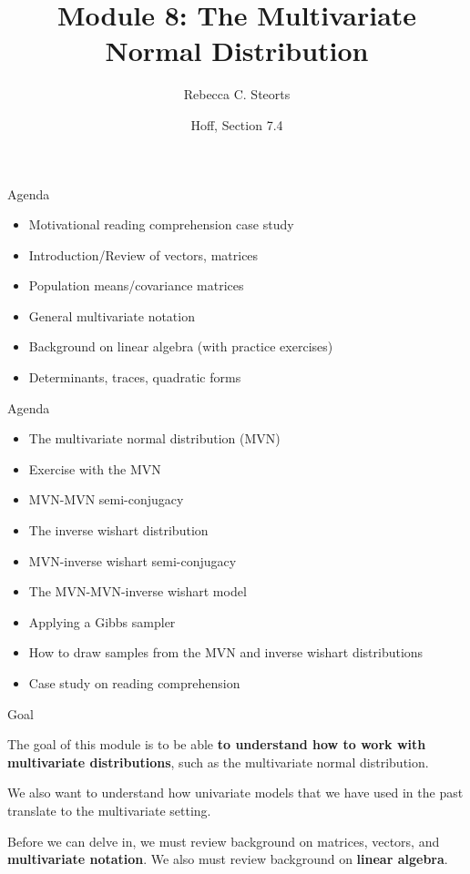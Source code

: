 \documentclass[
  ignorenonframetext,
]{beamer}
\title{Module 8: The Multivariate Normal Distribution}
\author{Rebecca C. Steorts}
\date{Hoff, Section 7.4}
\providecommand{\tightlist}{%
  \setlength{\itemsep}{0pt}\setlength{\parskip}{0pt}}
\begin{document}
\frame{\titlepage}

\begin{frame}{Agenda}
\protect\hypertarget{agenda}{}

\begin{itemize}
\tightlist
\item
  Motivational reading comprehension case study
\item
  Introduction/Review of vectors, matrices
\item
  Population means/covariance matrices
\item
  General multivariate notation
\item
  Background on linear algebra (with practice exercises)
\item
  Determinants, traces, quadratic forms
\end{itemize}

\end{frame}

\begin{frame}{Agenda}
\protect\hypertarget{agenda-1}{}

\begin{itemize}
\tightlist
\item
  The multivariate normal distribution (MVN)
\item
  Exercise with the MVN
\item
  MVN-MVN semi-conjugacy
\item
  The inverse wishart distribution
\item
  MVN-inverse wishart semi-conjugacy
\item
  The MVN-MVN-inverse wishart model
\item
  Applying a Gibbs sampler
\item
  How to draw samples from the MVN and inverse wishart distributions
\item
  Case study on reading comprehension
\end{itemize}

\end{frame}

\begin{frame}{Goal}
\protect\hypertarget{goal}{}

The goal of this module is to be able \textbf{to understand how to work
with multivariate distributions}, such as the multivariate normal
distribution.

We also want to understand how univariate models that we have used in
the past translate to the multivariate setting.

Before we can delve in, we must review background on matrices, vectors,
and \textbf{multivariate notation}. We also must review background on
\textbf{linear algebra}.

\end{frame}
\end{document}
